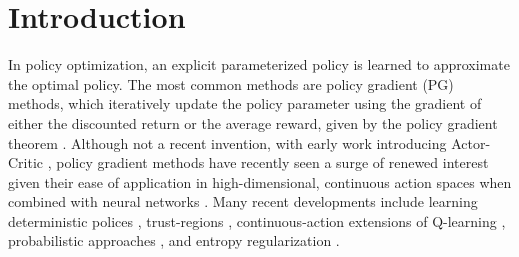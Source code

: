 \documentclass{article}
\begin{document}

\section{Introduction}

In policy optimization, an explicit parameterized policy is learned to approximate the optimal policy. The most common methods are policy gradient (PG) methods, which iteratively update the policy parameter using the gradient of either the discounted return or the average reward, given by the {policy gradient theorem} \citep{sutton2000policy}.
Although not a recent invention, with early work introducing Actor-Critic \citep{sutton1984}, policy gradient methods have recently seen a surge of renewed interest given their ease of application in high-dimensional, continuous action spaces when combined with neural networks \citep{schulman2015high,wang2016sample}. Many recent developments include learning deterministic polices \citep{silver2014deterministic,lillicrap2015continuous}, trust-regions \citep{schulman2015trust,schulman2017proximal}, continuous-action extensions of Q-learning \citep{ haarnoja2017reinforcement,lim2018actor,ryu2019caql}, probabilistic approaches \citep{abdolmaleki2018maximum,fellows2019virel}, and entropy regularization \citep{haarnoja2017reinforcement, haarnoja2018soft}.
\end{document}
